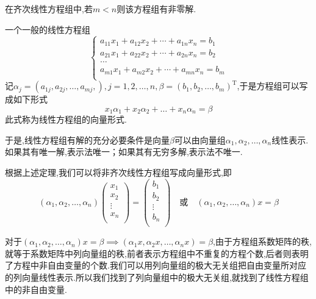 \begin{ttheorem}
    在齐次线性方程组中,若$m<n$则该方程组有非零解.
\end{ttheorem}

\begin{ttheorem}
    一个一般的线性方程组
    \begin{equation*}
        \begin{cases}
            a_{11}x_1+a_{12}x_2+\dotsm+a_{1n}x_n= b_1 \\
            a_{21}x_1+a_{22}x_2+\dotsm+a_{2n}x_n= b_2 \\
            \dots \\
            a_{m1}x_1+a_{m2}x_2+\dotsm+a_{mn}x_n= b_m \\
        \end{cases}
    \end{equation*}
    记$\alpha_j=(a_{1j},a_{2j},\dots,a_{mj},),j=1,2,\dots,n,\beta=(b_1,b_2,\dots,b_m)^\mathrm{T}$,于是方程组可以写成如下形式
    \begin{equation*}
        x_1\alpha_1+x_2\alpha_2+\dots+x_n\alpha_n=\beta
    \end{equation*}
    此式称为线性方程组的向量形式.

    于是,线性方程组有解的充分必要条件是向量$\beta$可以由向量组$\alpha_1,\alpha_2,\dots,\alpha_n$线性表示.如果其有唯一解,表示法唯一；如果其有无穷多解,表示法不唯一.
\end{ttheorem}

根据上述定理,我们可以将非齐次线性方程组写成向量形式,即
\begin{equation*}
    (\alpha_1,\alpha_2,\dots,\alpha_n)
    \begin{pmatrix}
    x_1\\
    x_2\\
    \vdots\\
    x_n\\
    \end{pmatrix}=
    \begin{pmatrix}
    b_1\\
    b_2\\
    \vdots\\
    b_n\\
    \end{pmatrix} \quad
    \text{或} \quad
    (\alpha_1,\alpha_2,\dots,\alpha_n)
    x=\beta
\end{equation*}

对于$(\alpha_1,\alpha_2,\dots,\alpha_n)x=\beta \implies (\alpha_1x,\alpha_2x,\dots,\alpha_nx)
=\beta$,由于方程组系数矩阵的秩,就等于系数矩阵中列向量组的秩,前者表示方程组中不重复的方程个数,后者则表明了方程中非自由变量的个数.我们可以用列向量组的极大无关组把自由变量所对应的列向量线性表示.所以我们找到了列向量组中的极大无关组,就找到了线性方程组中的非自由变量.

